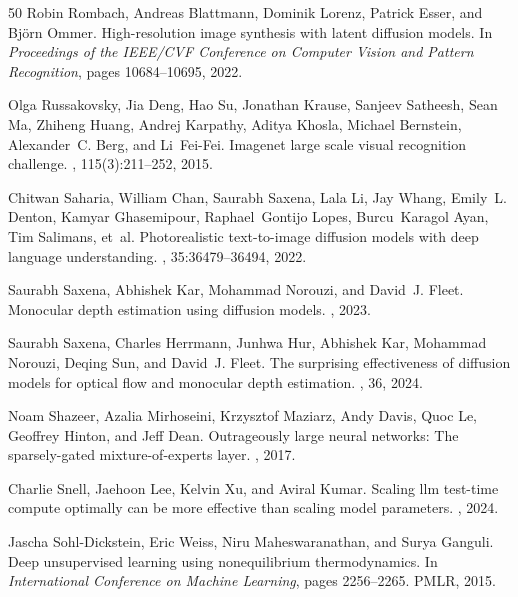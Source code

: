 \documentclass[manuscript,screen,review]{acmart}
\begin{document}
\begin{thebibliography}{50}
Robin Rombach, Andreas Blattmann, Dominik Lorenz, Patrick Esser, and Bj{\"o}rn Ommer.
\newblock High-resolution image synthesis with latent diffusion models.
\newblock In {\em Proceedings of the IEEE/CVF Conference on Computer Vision and Pattern Recognition}, pages 10684--10695, 2022.

Olga Russakovsky, Jia Deng, Hao Su, Jonathan Krause, Sanjeev Satheesh, Sean Ma, Zhiheng Huang, Andrej Karpathy, Aditya Khosla, Michael Bernstein, Alexander~C. Berg, and Li~Fei-Fei.
\newblock Imagenet large scale visual recognition challenge.
, 115(3):211--252, 2015.

Chitwan Saharia, William Chan, Saurabh Saxena, Lala Li, Jay Whang, Emily~L. Denton, Kamyar Ghasemipour, Raphael~Gontijo Lopes, Burcu~Karagol Ayan, Tim Salimans, et~al.
\newblock Photorealistic text-to-image diffusion models with deep language understanding.
, 35:36479--36494, 2022.

Saurabh Saxena, Abhishek Kar, Mohammad Norouzi, and David~J. Fleet.
\newblock Monocular depth estimation using diffusion models.
, 2023.

Saurabh Saxena, Charles Herrmann, Junhwa Hur, Abhishek Kar, Mohammad Norouzi, Deqing Sun, and David~J. Fleet.
\newblock The surprising effectiveness of diffusion models for optical flow and monocular depth estimation.
, 36, 2024.

Noam Shazeer, Azalia Mirhoseini, Krzysztof Maziarz, Andy Davis, Quoc Le, Geoffrey Hinton, and Jeff Dean.
\newblock Outrageously large neural networks: The sparsely-gated mixture-of-experts layer.
, 2017.

Charlie Snell, Jaehoon Lee, Kelvin Xu, and Aviral Kumar.
\newblock Scaling llm test-time compute optimally can be more effective than scaling model parameters.
, 2024.

Jascha Sohl-Dickstein, Eric Weiss, Niru Maheswaranathan, and Surya Ganguli.
\newblock Deep unsupervised learning using nonequilibrium thermodynamics.
\newblock In {\em International Conference on Machine Learning}, pages 2256--2265. PMLR, 2015.


\end{thebibliography}
\end{document}
